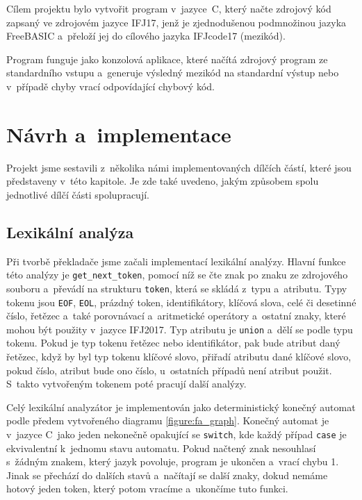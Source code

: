 \documentclass[a4paper, 11pt]{article}
\begin{document}
	Cílem projektu bylo vytvořit program v~jazyce~C, který načte zdrojový kód zapsaný ve zdrojovém jazyce IFJ17,
	jenž je zjednodušenou podmnožinou jazyka FreeBASIC a~přeloží jej do cílového jazyka IFJcode17 (mezikód).

	Program funguje jako konzolová aplikace, které načítá zdrojový program ze standardního vstupu a~generuje
	výsledný mezikód na standardní výstup nebo v~případě chyby vrací odpovídající chybový kód.



	\section{Návrh a~implementace}

	Projekt jsme sestavili z~několika námi implementovaných dílčích částí, které jsou představeny v~této kapitole.
	Je zde také uvedeno, jakým způsobem spolu jednotlivé dílčí části spolupracují.


	\subsection{Lexikální analýza}

	Při tvorbě překladače jsme začali implementací lexikální analýzy. Hlavní funkce této analýzy je \texttt{get\_next\_token},
	pomocí níž se čte znak po znaku ze zdrojového souboru a~převádí na strukturu \texttt{token}, která se skládá z~typu a~atributu.
	Typy tokenu jsou \texttt{EOF}, \texttt{EOL}, prázdný token, identifikátory, klíčová slova, celé či desetinné číslo, řetězec
	a~také porovnávací a~aritmetické operátory a~ostatní znaky, které mohou být použity v~jazyce IFJ2017. Typ atributu je
	\texttt{union} a~dělí se podle typu tokenu. Pokud je typ tokenu řetězec nebo identifikátor, pak bude atribut daný řetězec,
	když by byl typ tokenu klíčové slovo, přiřadí atributu dané klíčové slovo, pokud číslo, atribut bude ono číslo, u~ostatních
	případů není atribut použit. S~takto vytvořeným tokenem poté pracují další analýzy.

	Celý lexikální analyzátor je implementován jako deterministický konečný automat podle předem vytvořeného diagramu
	\ref{figure:fa_graph}. Konečný automat je v~jazyce C~jako jeden nekonečně opakující se \texttt{switch}, kde každý případ
	\texttt{case} je ekvivalentní k~jednomu stavu automatu. Pokud načtený znak nesouhlasí s~žádným znakem, který jazyk povoluje,
	program je ukončen a~vrací chybu 1. Jinak se přechází do dalších stavů a~načítají se další znaky, dokud nemáme hotový jeden
	token, který potom vracíme a~ukončíme tuto funkci.
\end{document}
